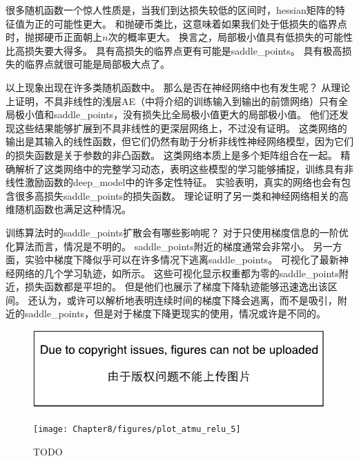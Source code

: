 
很多随机函数一个惊人性质是，当我们到达损失较低的区间时，\gls{hessian}矩阵的特征值为正的可能性更大。
和抛硬币类比，这意味着如果我们处于低损失的临界点时，抛掷硬币正面朝上$n$次的概率更大。
换言之，局部极小值具有低损失的可能性比高损失要大得多。
具有高损失的临界点更有可能是\gls{saddle_points}。
具有极高损失的临界点就很可能是局部极大点了。

以上现象出现在许多类随机函数中。
那么是否在神经网络中也有发生呢？
\cite{Baldi89}从理论上证明，不具非线性的浅层\gls{AE}（中将介绍的训练输入到输出的前馈网络）只有全局极小值和\gls{saddle_points}，没有损失比全局极小值更大的局部极小值。
他们还发现这些结果能够扩展到不具非线性的更深层网络上，不过没有证明。
这类网络的输出是其输入的线性函数，但它们仍然有助于分析非线性神经网络模型，因为它们的损失函数是关于参数的非凸函数。
这类网络本质上是多个矩阵组合在一起。
\cite{Saxe-et-al-ICLR13}精确解析了这类网络中的完整学习动态，表明这些模型的学习能够捕捉，训练具有非线性激励函数的\gls{deep_model}中的许多定性特征。
\cite{Dauphin-et-al-NIPS2014-small}实验表明，真实的网络也会有包含很多高损失\gls{saddle_points}的损失函数。
\cite{Choromanska-et-al-AISTATS2015}理论证明了另一类和神经网络相关的高维随机函数也满足这种情况。

训练算法时的\gls{saddle_points}扩散会有哪些影响呢？
对于只使用梯度信息的一阶优化算法而言，情况是不明的。
\gls{saddle_points}附近的梯度通常会非常小。
另一方面，实验中梯度下降似乎可以在许多情况下逃离\gls{saddle_points}。
\cite{GoodfellowOptimization15}可视化了最新神经网络的几个学习轨迹，如所示。
这些可视化显示权重都为零的\gls{saddle_points}附近，损失函数都是平坦的。
但是他们也展示了梯度下降轨迹能够迅速逸出该区间。
\cite{GoodfellowOptimization15}还认为，或许可以解析地表明连续时间的梯度下降会逃离，而不是吸引，附近的\gls{saddle_points}，但是对于梯度下降更现实的使用，情况或许是不同的。

\begin{figure}[!htb]
\ifOpenSource
\centerline{\includegraphics{figure.pdf}}
\else
\centerline{\texttt{[image: Chapter8/figures/plot\_atmu\_relu\_5]}}
\fi
\caption{TODO}
\label{fig:chap8_plot_atmu_relu_5}
\end{figure}


